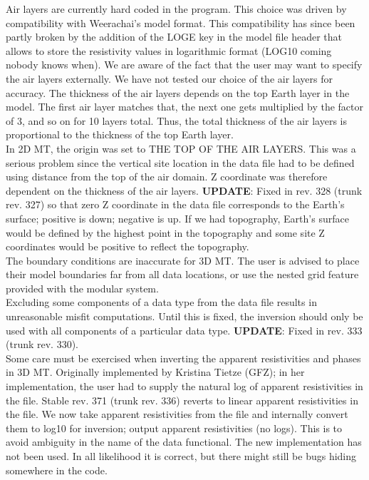 \documentclass[12pt]{article}
\begin{document}
Air layers are currently hard coded in the program. This choice was driven by compatibility with Weerachai's model format. This compatibility has since been partly broken by the addition of the LOGE key in the model file header that allows to store the resistivity values in logarithmic format (LOG10 coming nobody knows when). We are aware of the fact that the user may want to specify the air layers externally. We have not tested our choice of the air layers for accuracy. The thickness of the air layers depends on the top Earth layer in the model. The first air layer matches that, the next one gets multiplied by the factor of 3, and so on for 10 layers total. Thus, the total thickness of the air layers is proportional to the thickness of the top Earth layer.\\

In 2D MT, the origin was set to THE TOP OF THE AIR LAYERS. This was a serious problem since the vertical site location in the data file had to be defined using distance from the top of the air domain. Z coordinate was therefore dependent on the thickness of the air layers. \textbf{UPDATE}: Fixed in rev. 328 (trunk rev. 327) so that zero Z coordinate in the data file corresponds to the Earth's surface; positive is down; negative is up. If we had topography, Earth's surface would be defined by the highest point in the topography and some site Z coordinates would be positive to reflect the topography.\\

The boundary conditions are inaccurate for 3D MT. The user is advised to place their model boundaries far from all data locations, or use the nested grid feature provided with the modular system.\\

Excluding some components of a data type from the data file results in unreasonable misfit computations. Until this is fixed, the inversion should only be used with all components of a particular data type. \textbf{UPDATE}: Fixed in rev. 333 (trunk rev. 330).\\

Some care must be exercised when inverting the apparent resistivities and phases in 3D MT. Originally implemented by Kristina Tietze (GFZ); in her implementation, the user had to supply the natural log of apparent resistivities in the file. Stable rev. 371 (trunk rev. 336) reverts to linear apparent resistivities in the file. We now take apparent resistivities from the file and internally convert them to log10 for inversion; output apparent resistivities (no logs). This is to avoid ambiguity in the name of the data functional. The new implementation has not been used. In all likelihood it is correct, but there might still be bugs hiding somewhere in the code.\\
\end{document}
